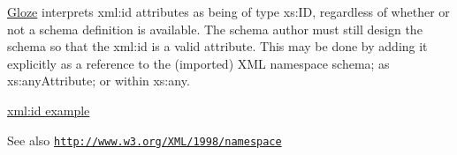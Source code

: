 \hyperlink{classcom_1_1hp_1_1gloze_1_1_gloze}{Gloze} interprets xml:id attributes as being of type xs:ID, regardless of whether or not a schema definition is available. The schema author must still design the schema so that the xml:id is a valid attribute. This may be done by adding it explicitly as a reference to the (imported) XML namespace schema; as xs:anyAttribute; or within xs:any.

\hyperlink{anyattribute}{xml:id example}

\begin{DoxySeeAlso}{See also}
\href{http://www.w3.org/XML/1998/namespace}{\tt http://www.w3.org/XML/1998/namespace} 
\end{DoxySeeAlso}

